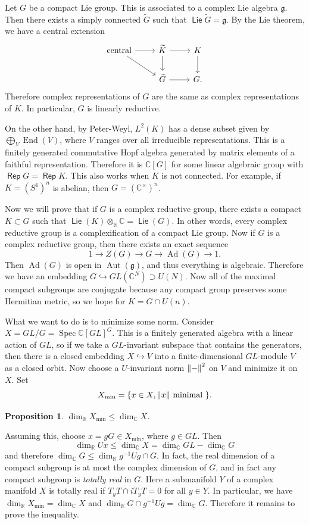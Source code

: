 \documentclass[leqno, openany]{memoir}
\newtheorem{prop}[thm]{Proposition}
\theoremstyle{definition}
\theoremstyle{remark}
\theoremstyle{plain}
\theoremstyle{definition}
\theoremstyle{remark}
\newcommand{\R}{\mathbb{R}}
\newcommand{\C}{\mathbb{C}}
\newcommand{\mf}[1]{\mathfrak{#1}}
\newcommand{\wtl}[1]{\widetilde{#1}}
\DeclareMathOperator{\End}{End}
\DeclareMathOperator{\Ad}{Ad}
\DeclareMathOperator{\Aut}{Aut}
\DeclareMathOperator{\Spec}{Spec}
\DeclareMathOperator{\Lie}{\mathsf{Lie}}
\DeclareMathOperator{\Rep}{\mathsf{Rep}}
\begin{document}
Let $G$ be a compact Lie group. This is associated to a complex Lie algebra
$\mf{g}$. Then there exists a simply connected $\wtl{G}$ such that $\Lie
\wtl{G} = \mf{g}$. By the Lie theorem, we have a central extension
\begin{equation*} \begin{tikzcd} \text{central} \ar{r} \ar{dr} & \wtl{K} \ar{r}
\ar{d} & K \ar{d} \\ & \wtl{G} \ar{r} & G.  \end{tikzcd} \end{equation*}
Therefore complex representations of $G$ are the same as complex
representations of $K$. In particular, $G$ is linearly reductive.

On the other hand, by Peter-Weyl, $L^2(K)$ has a dense subset given by
$\bigoplus_{V} \End(V)$, where $V$ ranges over all irreducible representations.
This is a finitely generated commutative Hopf algebra generated by matrix
elements of a faithful representation. Therefore it is $\C[G]$ for some linear
algebraic group with $\Rep G = \Rep K$. This also works when $K$ is not
connected. For example, if $K = {(S^1)}^n$ is abelian, then $G =
{(\C^{\times})}^n$.

Now we will prove that if $G$ is a complex reductive group, there exists a
compact $K \subset G$ such that $\Lie(K) \otimes_{\R} \C = \Lie(G)$. In other
words, every complex reductive group is a complexification of a compact Lie
group. Now if $G$ is a complex reductive group, then there exists an exact
sequence \[ 1 \to Z(G) \to G \to \Ad(G) \to 1. \] Then $\Ad(G)$ is open in
$\Aut(\mf{g})$, and thus everything is algebraic. Therefore we have an
embedding $G \hookrightarrow GL(\C^N) \supset U(N)$. Now all of the maximal
compact subgroups are conjugate because any compact group preserves some
Hermitian metric, so we hope for $K = G \cap U(n)$.

What we want to do is to minimize some norm. Consider $X = GL/G = {\Spec
\C[GL]}^G$. This is a finitely generated algebra with a linear action of $GL$,
so if we take a $GL$-invariant subspace that contains the generators, then
there is a closed embedding $X \hookrightarrow V$ into a finite-dimensional
$GL$-module $V$ as a closed orbit. Now choose a $U$-invariant norm $\norm{-}^2$
on $V$ and minimize it on $X$. Set \[ X_{\min} = \qty{x \in X, \norm{x} \text{
minimal }}. \] \begin{prop} $\dim_{\R} X_{\min} \leq \dim_{\C} X$.  \end{prop}

Assuming this, choose $x = gG \in X_{\min}$, where $g \in GL$. Then \[
\dim_{\R} U x \leq \dim_{\C} X = \dim_{\C} GL - \dim_{\C} G \] and therefore
$\dim_{\C} G \leq \dim_{\R} g^{-1} U g \cap G$. In fact, the real dimension of
a compact subgroup is at most the complex dimension of $G$, and in fact any
compact subgroup is \textit{totally real} in $G$. Here a submanifold $Y$ of a
complex manifold $X$ is totally real if $T_y T \cap i T_y T = 0$ for all $y \in
Y$. In particular, we have $\dim_{\R} X_{\min} = \dim_{\C} X$ and $\dim_{\R} G
\cap g^{-1} U g = \dim_{\C} G$. Therefore it remains to prove the inequality.
\end{document}
